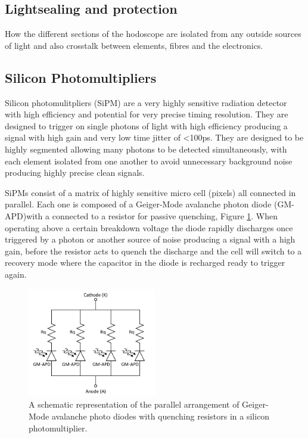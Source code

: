 \subsection{Lightsealing and protection}
How the different sections of the hodoscope are isolated from any outside sources of light and also crosstalk between elements, fibres and the electronics.


\subsection{Silicon Photomultipliers}

Silicon photomulitpliers (SiPM) are a very highly sensitive radiation detector with high efficiency and potential for very precise timing resolution. They are designed to trigger on single photons of light with high efficiency producing a signal with high gain and very low time jitter of <100ps. They are designed to be highly segmented allowing many photons to be detected simultaneously, with each element isolated from one another to avoid unnecessary background noise producing highly precise clean signals.

SiPMs consist of a matrix of highly sensitive micro cell (pixels) all connected in parallel. Each one is composed of a Geiger-Mode avalanche photon diode (GM-APD)with a connected to a resistor for passive quenching, Figure \ref{SiPMCircuit}. When operating above a certain breakdown voltage the diode rapidly discharges once triggered by a photon or another source of noise producing a signal with a high gain, before the resistor acts to quench the discharge and the cell will switch to a recovery mode where the capacitor in the diode is recharged ready to trigger again. 

\begin{figure}[!ht]
	\centering
	\includegraphics[width=0.5\textwidth]{ImgChap1/SiPM1}
	\caption{A schematic representation of the parallel arrangement of Geiger-Mode avalanche photo diodes with quenching resistors in a silicon photomultiplier. \cite{website:AdvanSiDSiPMpdf}}
	\label{SiPMCircuit}
\end{figure}

